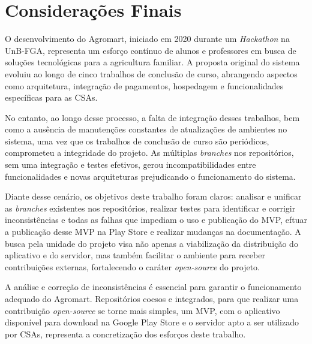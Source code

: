 \chapter[Considerações Finais]{Considerações Finais}

O desenvolvimento do Agromart, iniciado em 2020 durante um \textit{Hackathon} na UnB-FGA, representa um esforço contínuo de alunos e professores em busca de soluções tecnológicas para a agricultura familiar. A proposta original do sistema evoluiu ao longo de cinco trabalhos de conclusão de curso, abrangendo aspectos como arquitetura, integração de pagamentos, hospedagem e funcionalidades específicas para as CSAs.

No entanto, ao longo desse processo, a falta de integração desses trabalhos, bem como a ausência de manutenções constantes de atualizações de ambientes no sistema, uma vez que os trabalhos de conclusão de curso são periódicos, comprometeu a integridade do projeto. As múltiplas \textit{branches} nos repositórios, sem uma integração e testes efetivos, gerou incompatibilidades entre funcionalidades e novas arquiteturas prejudicando o funcionamento do sistema.

Diante desse cenário, os objetivos deste trabalho foram claros: analisar e unificar as \textit{branches} existentes nos repositórios, realizar testes para identificar e corrigir inconsistências e todas as falhas que impediam o uso e publicação do MVP, eftuar a publicação desse MVP na Play Store e realizar mudanças na documentação. A busca pela unidade do projeto visa não apenas a viabilização da distribuição do aplicativo e do servidor, mas também facilitar o ambiente para receber contribuições externas, fortalecendo o caráter \textit{open-source} do projeto.

A análise e correção de inconsistências é essencial para garantir o funcionamento adequado do Agromart. Repositórios coesos e integrados, para que realizar uma contribuição \textit{open-source} se torne mais simples, um MVP, com o aplicativo disponível para download na Google Play Store e o servidor apto a ser utilizado por CSAs, representa a concretização dos esforços deste trabalho.
